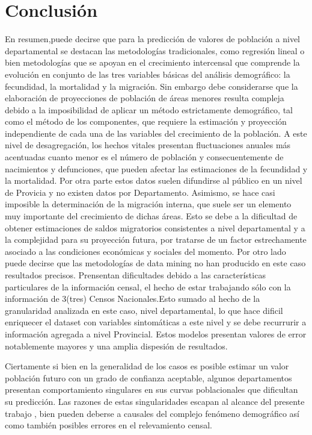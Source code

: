 \documentclass{article}
\theoremstyle{mytheoremstyle}
\theoremstyle{mytheoremstyle}
\theoremstyle{myproblemstyle}
\begin{document}
 \section{Conclusión} 
En resumen,puede decirse  que para la predicción de valores de población a nivel departamental
 se destacan las metodologías tradicionales, como regresión lineal o bien metodologías que se apoyan en el crecimiento intercensal que comprende la evolución en conjunto
 de las tres variables básicas del análisis demográfico: la fecundidad, la mortalidad y la migración.\newline
  Sin embargo debe  considerarse que la elaboración de proyecciones de población de áreas menores resulta compleja
 debido a la imposibilidad de aplicar un método estrictamente demográfico, tal como el método de los componentes,
 que requiere la estimación y proyección independiente de cada una de las variables del crecimiento
 de la población. A este nivel de desagregación, los hechos vitales
 presentan fluctuaciones anuales más acentuadas cuanto menor es el número de población y consecuentemente 
 de nacimientos y defunciones, que pueden afectar las estimaciones de la fecundidad y la mortalidad.\newline
 Por otra parte estos datos suelen difundirse al público en un nivel de Provicia y no existen datos por Departamento.
 Asimismo, se hace casi imposible la determinación de la migración interna, que suele ser un
 elemento muy importante del crecimiento de dichas áreas. Esto se debe a la dificultad de obtener estimaciones 
 de saldos migratorios consistentes a nivel departamental y a la complejidad para su proyección futura,
 por tratarse de un factor estrechamente asociado a las condiciones económicas y sociales del momento.\newline
Por otro lado puede decirse que las metodologías de data mining no han producido en este caso resultados precisos.
 Prensentan dificultades debido a las características particulares de la información censal,
 el hecho de estar trabajando sólo con la información de 3(tres) Censos Nacionales.Esto sumado al hecho de la granularidad
analizada en este caso, nivel departamental, lo que hace dificil enriquecer el dataset con variables sintomáticas a este nivel y se debe recurrurir a información agregada
a nivel Provincial. Estos modelos presentan valores de error notablemente mayores y una amplia dispesión de resultados.\newline

Ciertamente si bien en la generalidad de los casos es posible estimar un valor población futuro con un grado de confianza 
aceptable, algunos departamentos presentan comportamiento singulares en sus curvas poblacionales que dificultan 
su predicción. Las razones de estas singularidades escapan al alcance del presente trabajo , 
bien pueden deberse a causales del  complejo fenómeno demográfico así como también posibles errores en el relevamiento censal.
\end{document}
